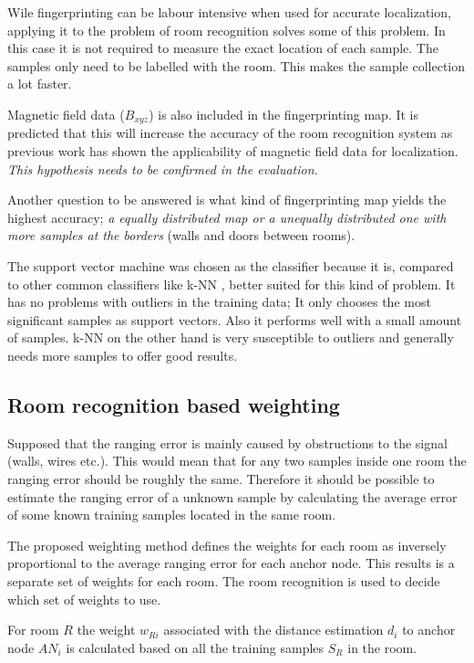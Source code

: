 Wile fingerprinting can be labour intensive when used for accurate localization, applying it to the problem of room recognition solves some of this problem. In this case it is not required to measure the exact location of each sample. The samples only need to be labelled with the room. This makes the sample collection a lot faster.

Magnetic field data ($B_{xyz}$) is also included in the fingerprinting map. It is predicted that this will increase the accuracy of the room recognition system as previous work has shown the applicability of  magnetic field data for localization. \emph{This hypothesis needs to be confirmed in the evaluation.}

Another question to be answered is what kind of fingerprinting map yields the highest accuracy; \emph{a equally distributed map or a unequally distributed one with more samples at the borders }(walls and doors between rooms).

The support vector machine was chosen as the classifier because it is, compared to other common classifiers like k-NN , better suited for this kind of problem. It has no problems with outliers in the training data; It only chooses the most significant samples as support vectors. Also it performs well with a small amount of samples. k-NN on the other hand is very susceptible to outliers and generally needs more samples to offer good results.

\subsection{Room recognition based weighting}
Supposed that the ranging error is mainly caused by obstructions to the signal (walls, wires etc.). This would mean that for any two samples inside one room the ranging error should be roughly the same. Therefore it should be possible to estimate the ranging error of a unknown sample by calculating the average error of some known training samples located in the same room.

The proposed weighting method defines the weights for each room as inversely proportional to the average ranging error for each anchor node. This results is a separate set of weights for each room. The room recognition is used to decide which set of weights to use.

For room $R$ the weight $w_{Ri}$ associated with the distance estimation $d_i$ to anchor node $AN_i$ is calculated based on all the training samples $S_R$ in the room.


